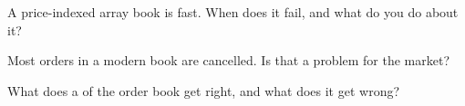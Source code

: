 \begin{interviewq}\label{iq:mx:the-limit-order-book:4}
A price-indexed array book is fast. When does it fail, and what do you do about it?
\end{interviewq}

\begin{interviewq}\label{iq:mx:the-limit-order-book:5}
Most orders in a modern book are cancelled. Is that a problem for the market?
\end{interviewq}

\begin{interviewq}\label{iq:mx:the-limit-order-book:6}
What does a  of the order book get right, and what does it get wrong?
\end{interviewq}
